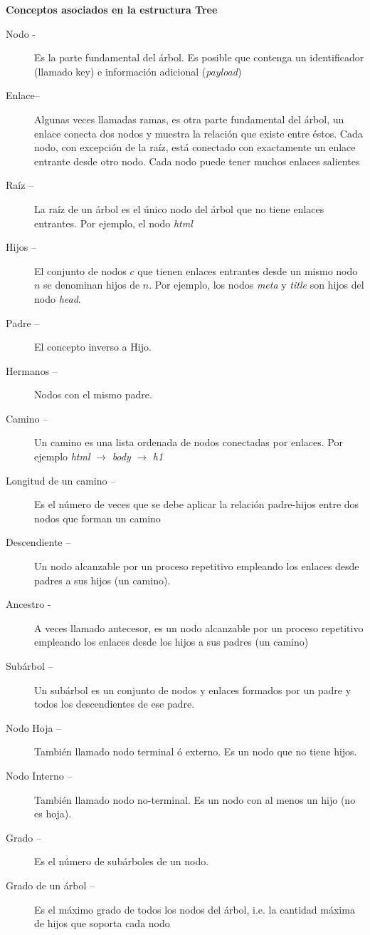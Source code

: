\textbf{Conceptos asociados en la estructura Tree}
\begin{description}
\item[Nodo -] Es la parte fundamental del árbol. Es posible que contenga un identificador (llamado key) e información adicional (\textit{payload})
\item[Enlace– ] Algunas veces llamadas ramas, es otra parte fundamental del árbol, un enlace conecta dos nodos y muestra la relación que existe entre éstos. Cada nodo, con excepción de la raíz, está conectado con exactamente un enlace entrante desde otro nodo. Cada nodo puede tener muchos enlaces salientes
\item[Raíz –] La raíz de un árbol es el único nodo del árbol que no tiene enlaces entrantes. Por ejemplo, el nodo \textit{html}
\item[Hijos –] El conjunto de nodos $c$ que tienen enlaces entrantes desde un mismo nodo $n$ se denominan hijos de $n$. Por ejemplo, los nodos \textit{meta} y \textit{title} son hijos del nodo \textit{head}.
\item[Padre –] El concepto inverso a Hijo.
\item[Hermanos –] Nodos con el mismo padre.
\item[Camino –] Un camino es una lista ordenada de nodos conectadas por enlaces. Por ejemplo \textit{html} $\to$ \textit{body} $\to$ \textit{h1}
\item[Longitud de un camino –] Es el número de veces que se debe aplicar la relación padre-hijos entre dos nodos que forman un camino
\item[Descendiente –] Un nodo alcanzable por un proceso repetitivo empleando los enlaces desde padres a sus hijos (un camino).
\item[Ancestro -] A veces llamado antecesor, es un nodo alcanzable por un proceso repetitivo empleando los enlaces desde los hijos a sus padres (un camino)
\item[Subárbol –] Un subárbol es un conjunto de nodos y enlaces formados por un padre y todos los descendientes de ese padre.
\item[Nodo Hoja –] También llamado nodo terminal ó externo. Es un nodo que no tiene hijos.
\item[Nodo Interno –] También llamado nodo no-terminal. Es un nodo con al menos un hijo (no es hoja).
\item[Grado –] Es el número de subárboles de un nodo.
\item[Grado de un árbol –] Es el máximo grado de todos los nodos del árbol, i.e. la cantidad máxima de hijos que soporta cada nodo

\end{description}
